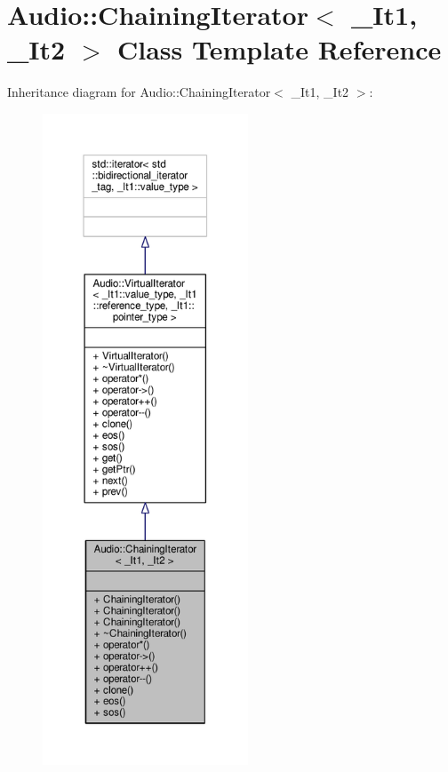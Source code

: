 \hypertarget{classAudio_1_1ChainingIterator}{}\section{Audio\+:\+:Chaining\+Iterator$<$ \+\_\+\+It1, \+\_\+\+It2 $>$ Class Template Reference}
\label{classAudio_1_1ChainingIterator}


Inheritance diagram for Audio\+:\+:Chaining\+Iterator$<$ \+\_\+\+It1, \+\_\+\+It2 $>$\+:
\nopagebreak
\begin{figure}[H]
\begin{center}
\leavevmode
\includegraphics[height=550pt]{dc/d2c/classAudio_1_1ChainingIterator__inherit__graph}
\end{center}
\end{figure}


